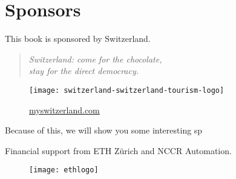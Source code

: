 \section{Sponsors}

This book is sponsored by Switzerland.

\begin{quote}
    \itshape
    Switzerland: come for the chocolate,\\
    stay for the direct democracy.
\end{quote}

\begin{figure}[h]
    \centering
    \texttt{[image: switzerland-switzerland-tourism-logo]}

    \href{http://myswitzerland.com}{myswitzerland.com}
\end{figure}

Because of this, we will show you some interesting sp

Financial support from ETH Zürich and NCCR Automation.
\begin{figure}[h]
    \centering
    \texttt{[image: ethlogo]}
\end{figure}

